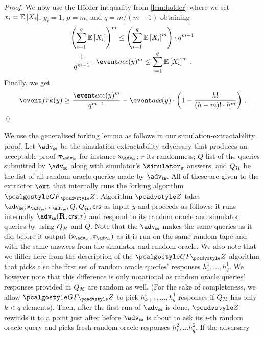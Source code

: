 \let\accentvec\vec \documentclass[runningheads]{llncs}
\begin{document}
\begin{proof}
We now use the H\"older inequality from \cref{lem:holder} where we set  $x_i = \mathbb{E}\left[X_i\right]$, $y_i = 1$, $p = m$, and $q = m/(m - 1)$ obtaining
\begin{gather}
	\left(\sum_{i = 1}^{q} \expected{X_i}\right)^{m}  \leq \left(\sum_{i = 1}^{q} \expected{X_i}^m\right) \cdot q^{m - 1}\\
	\frac{1}{q^{m - 1}} \cdot \accProb(y)^{m} \leq \sum_{i = 1}^{q} \expected{X_i}^m\,.
\end{gather}
Finally, we get
\[
	\frkProb(y) \geq \frac{\accProb(y)^m}{q^{m - 1}} - 
	 \accProb(y) \cdot \left(1 - \frac{h!}{(h - m)! \cdot h^m}\right)\,.
\]
\qed
\end{proof}


We use the generalised forking lemma as follows in our
simulation-extractability proof. Let $\advse$ be the simulation-extractability
adversary that produces an acceptable proof $\zkproof_\advse$ for
instance $\inp_\advse$; $r$ its randomness; $Q$ list of the queries submitted
by $\advse$ along with simulator's $\simulator_\zkproof$ answers; and $Q_{\mathcal{H}}$
be the list of all random oracle queries made by $\advse$. All of these are
given to the extractor $\ext$ that internally runs the forking algorithm
$\genforking_\zdv$.  
Algorithm $\zdv$ takes $\advse, \inp_\advse, \zkproof_\advse, Q, Q_\ro, \crs$
as input $y$ and proceeds as follows: it runs internally $\advse(\REL, \crs;
r)$ and respond to its random oracle and simulator queries by using $Q_{\mathcal{H}}$
and $Q$. Note that the $\advse$ makes the same queries as it did before it
output $(\inp_\advse, \zkproof_\advse)$ as it is run on the same random tape
and with the same answers from the simulator and random oracle. We also note
that we differ here from the description of the $\genforking_\zdv$ algorithm
that picks also the first set of random oracle queries' responses $h^1_1,
\ldots, h^1_q$. We however note that this difference is only notational as
random oracle queries' responses provided in $Q_{\mathcal{H}}$ are random as well. (For
the sake of completeness, we allow $\genforking_\zdv$ to pick $h^i_{k + 1}, \ldots,
h^1_q$ responses if $Q_{\mathcal{H}}$ has only $k < q$ elements).
Then, after the first run of $\advse$ is done, $\zdv$ rewinds it
to a point
just after before $\advse$ is about to ask its $i$-th random oracle query and
picks fresh random oracle responses $h^2_i, \ldots h^2_q$. If the adversary   
\end{document}
